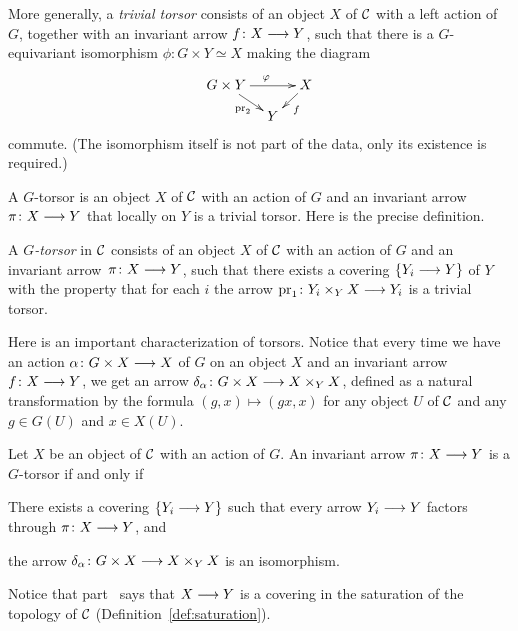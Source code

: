 \begin{4   STACKS}
\begin{4.4 Descent along torsors}
More generally, a \emph{trivial torsor} consists of an object $X$ of $\mathcal{C}$ with a left action of $G$, together with an invariant arrow $f \colon X \arr Y$, such that there is a $G$-equivariant isomorphism $\phi \colon G \times Y \simeq X$ making the diagram
   \[
   \xymatrix@-15pt{
   G \times Y\ar[rr]^{\phi} \ar[rd]_-{\pr_2} &&
   X \ar[ld]^f \\
   & Y
   }
   \]
commute. (The isomorphism itself is not part of the data, only its existence is required.)

A $G$-torsor is an object $X$ of $\mathcal{C}$ with an action of $G$ and an invariant arrow\ $\pi\colon X \arr Y$ that locally on $Y$ is a trivial torsor. Here is the precise definition.

\begin{definition}
A \emph{$G$-torsor} in $\mathcal{C}$ consists of an object $X$ of $\mathcal{C}$ with an action of $G$ and an invariant arrow\ $\pi \colon X \arr Y$, such that there exists a covering $\{Y_i \arr Y\}$ of $Y$ with the property that for each $i$ the arrow $\pr_1 \colon Y_i \times_Y X \arr Y_i$ is a trivial torsor.
\end{definition}

Here is an important characterization of torsors. Notice that every time we have an action $\alpha \colon G \times X \arr X$ of $G$ on an object $X$ and an invariant arrow $f \colon X \arr Y$, we get an arrow $\delta_\alpha \colon G \times X \arr X \times_Y X$, defined as a natural transformation by the formula $(g, x) \mapsto (gx, x)$ for any object $U$ of $\mathcal{C}$ and any $g \in G(U)$ and $x \in X(U)$.

\begin{proposition}
Let $X$ be an object of $\mathcal{C}$ with an action of $G$. An invariant arrow $\pi \colon X \arr Y$ is a $G$-torsor if and only if

\begin{enumeratei}

 There exists a covering $\{Y_i \arr Y\}$ such that every arrow $Y_i \arr Y$ factors through $\pi \colon X \arr Y$, and

 the arrow $\delta_\alpha \colon G \times X \arr X \times_Y X$ is an isomorphism.

\end{enumeratei}
\end{proposition}

Notice that part~ says that $X \arr Y$ is a covering in the saturation of the topology of $\mathcal{C}$ (Definition~\ref{def:saturation}).


\end{4.4 Descent along torsors}
\end{4   STACKS}
